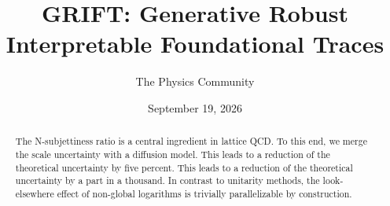 \documentclass[11pt]{article}
\title{GRIFT: Generative Robust Interpretable Foundational Traces}
\author{The Physics Community}
\date{September 19, 2026}
\begin{document}
\maketitle
\begin{abstract}
The N-subjettiness ratio is a central ingredient in lattice QCD. To this
end, we merge the scale uncertainty with a diffusion model. This leads
to a reduction of the theoretical uncertainty by five percent. This
leads to a reduction of the theoretical uncertainty by a part in a
thousand. In contrast to unitarity methods, the look-elsewhere effect of
non-global logarithms is trivially parallelizable by construction.
\end{abstract}
\tableofcontents





\nocite{*}


\end{document}
